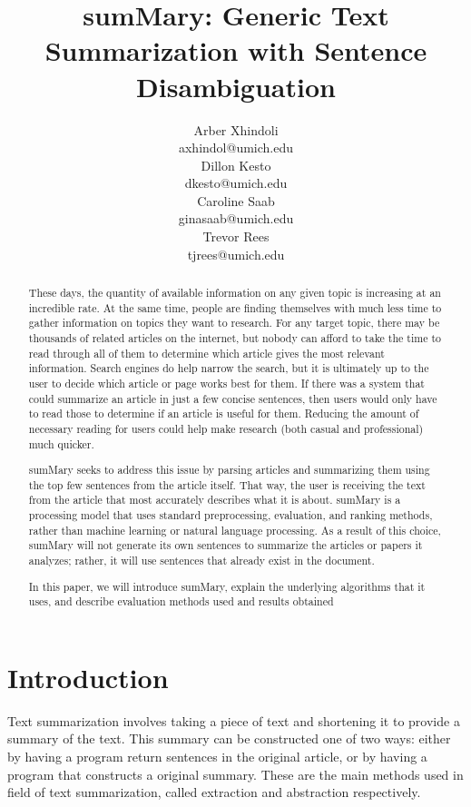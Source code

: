\documentclass[11pt,a4paper]{article}
\title{sumMary: Generic Text Summarization with Sentence Disambiguation}
\author{Arber Xhindoli \\
  {axhindol@umich.edu} \\\And
  Dillon Kesto \\
  {dkesto@umich.edu}  \\\And
  Caroline Saab \\
  {ginasaab@umich.edu} \\\And
  Trevor Rees \\
  {tjrees@umich.edu} \\
  }
\date{}
\begin{document}
\maketitle
\begin{abstract}
 These days, the quantity of available information on any given topic is increasing at an incredible rate. At the same time, people are finding themselves with much less time to gather information on topics they want to research. For any target topic, there may be thousands of related articles on the internet, but nobody can afford to take the time to read through all of them to determine which article gives the most relevant information. Search engines do help narrow the search, but it is ultimately up to the user to decide which article or page works best for them. If there was a system that could summarize an article in just a few concise sentences, then users would only have to read those to determine if an article is useful for them. Reducing the amount of necessary reading for users could help make research (both casual and professional) much quicker.

sumMary seeks to address this issue by parsing articles and summarizing them using the top few sentences from the article itself. That way, the user is receiving the text from the article that most accurately describes what it is about. sumMary is a processing model that uses standard preprocessing, evaluation, and ranking methods, rather than machine learning or natural language processing. As a result of this choice, sumMary will not generate its own sentences to summarize the articles or papers it analyzes; rather, it will use sentences that already exist in the document.

In this paper, we will introduce sumMary, explain the underlying algorithms that it uses, and describe evaluation methods used and results obtained
\end{abstract}
\section{Introduction}

Text summarization involves taking a piece of text and shortening it to provide a summary of the text. This summary can be constructed one of two ways: either by having a program return sentences in the original article, or by having a program that constructs a original summary. These are the main methods used in field of text summarization, called extraction and abstraction respectively. 
\end{document}
